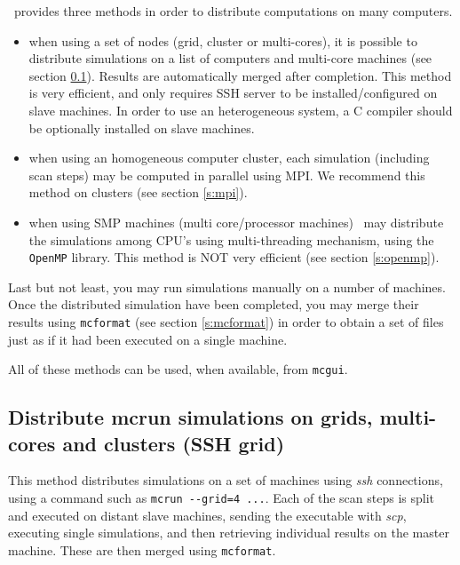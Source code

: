 \MCS\ provides three methods in order to distribute computations on many computers.
\begin{itemize}
\item when using a set of nodes (grid, cluster or multi-cores), it is possible to distribute simulations on a 
  list of computers and multi-core machines (see section \ref{s:ssh-grid}). Results are automatically 
  merged after completion. 
  This method is very efficient, and only requires SSH server to be installed/configured on slave machines. 
  In order to use an heterogeneous system, a C compiler should be optionally installed on slave machines.
\item when using an homogeneous computer cluster, each simulation (including scan
  steps) may be computed in parallel using MPI. We recommend this method on clusters (see section \ref{s:mpi}).
\item when using SMP machines (multi core/processor machines) \MCS\ may
  distribute the simulations among CPU's using multi-threading
  mechanism, using the \verb+OpenMP+ library. This method is NOT very efficient (see section \ref{s:openmp}).
\end{itemize}

Last but not least, you may run simulations manually on a number of machines.
Once the distributed simulation have been completed, you may merge their results using \verb+mcformat+ (see section \ref{s:mcformat})  in order to obtain a set of files just as if it had been executed on a single machine.

All of these methods can be used, when available, from \texttt{mcgui}.

\subsection{Distribute mcrun simulations on grids, multi-cores and clusters (SSH grid)}
\label{s:ssh-grid}
  This method distributes simulations on a set of machines using \emph{ssh}
  connections, using a command such as \verb+mcrun --grid=4 ...+. 
  Each of the scan steps is split and executed on distant slave machines, sending the executable
  with \emph{scp}, executing single simulations, and then retrieving individual
  results on the master machine. These are then merged using \texttt{mcformat}. 
  
